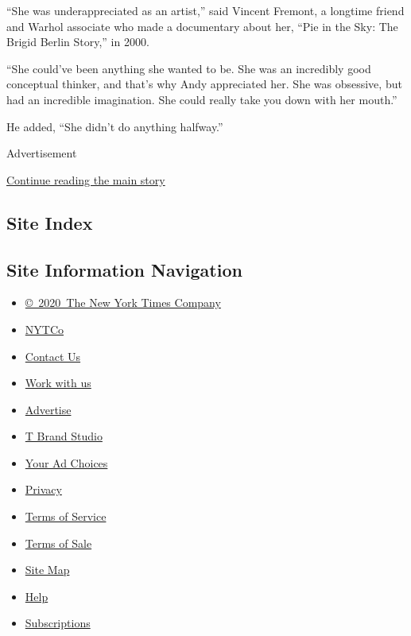 ``She was underappreciated as an artist,'' said Vincent Fremont, a
longtime friend and Warhol associate who made a documentary about her,
``Pie in the Sky: The Brigid Berlin Story,'' in 2000.

``She could've been anything she wanted to be. She was an incredibly
good conceptual thinker, and that's why Andy appreciated her. She was
obsessive, but had an incredible imagination. She could really take you
down with her mouth.''

He added, ``She didn't do anything halfway.''

Advertisement

\protect\hyperlink{after-bottom}{Continue reading the main story}

\hypertarget{site-index}{%
\subsection{Site Index}\label{site-index}}

\hypertarget{site-information-navigation}{%
\subsection{Site Information
Navigation}\label{site-information-navigation}}

\begin{itemize}
\tightlist
\item
  \href{https://help.nytimes.com/hc/en-us/articles/115014792127-Copyright-notice}{©~2020~The
  New York Times Company}
\end{itemize}

\begin{itemize}
\tightlist
\item
  \href{https://www.nytco.com/}{NYTCo}
\item
  \href{https://help.nytimes.com/hc/en-us/articles/115015385887-Contact-Us}{Contact
  Us}
\item
  \href{https://www.nytco.com/careers/}{Work with us}
\item
  \href{https://nytmediakit.com/}{Advertise}
\item
  \href{http://www.tbrandstudio.com/}{T Brand Studio}
\item
  \href{https://www.nytimes.com/privacy/cookie-policy\#how-do-i-manage-trackers}{Your
  Ad Choices}
\item
  \href{https://www.nytimes.com/privacy}{Privacy}
\item
  \href{https://help.nytimes.com/hc/en-us/articles/115014893428-Terms-of-service}{Terms
  of Service}
\item
  \href{https://help.nytimes.com/hc/en-us/articles/115014893968-Terms-of-sale}{Terms
  of Sale}
\item
  \href{https://spiderbites.nytimes.com}{Site Map}
\item
  \href{https://help.nytimes.com/hc/en-us}{Help}
\item
  \href{https://www.nytimes.com/subscription?campaignId=37WXW}{Subscriptions}
\end{itemize}
